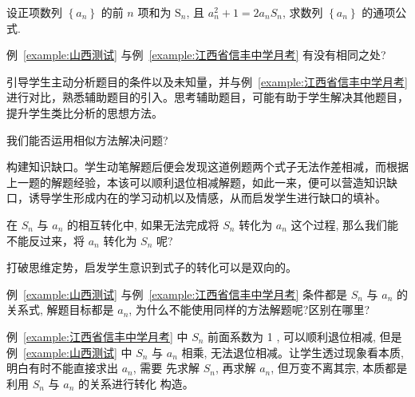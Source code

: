 \begin{example}[2019·山西测试]\label{example:山西测试}
  设正项数列 $\left\{a_{n}\right\}$ 的前 $n$ 项和为 $\mathrm{S}_{n}$, 且 $a_{n}^{2}+1=2 a_{n} S_{n}$, 求数列 $\left\{a_{n}\right\}$ 的通项公式.
\end{example}

\begin{question}
  例~\ref{example:山西测试} 与例~\ref{example:江西省信丰中学月考} 有没有相同之处?
\end{question}

\begin{designgoal}
  引导学生主动分析题目的条件以及未知量，并与例~\ref{example:江西省信丰中学月考} 进行对比，熟悉辅助题目的引入。思考辅助题目，可能有助于学生解决其他题目，提升学生类比分析的思想方法。
\end{designgoal}

\begin{question}
  我们能否运用相似方法解决问题?
\end{question}

\begin{designgoal}
  构建知识缺口。学生动笔解题后便会发现这道例题两个式子无法作差相减，而根据上一题的解题经验，本该可以顺利退位相减解题，如此一来，便可以营造知识缺口，诱导学生形成内在的学习动机以及情感，从而启发学生进行缺口的填补。
\end{designgoal}

\begin{question}
  在 $S_{n}$ 与 $a_{n}$ 的相互转化中, 如果无法完成将 $S_{n}$ 转化为 $a_{n}$ 这个过程, 那么我们能不能反过来，将 $a_{n}$ 转化为 $S_n$ 呢?
\end{question}

\begin{designgoal}
  打破思维定势，启发学生意识到式子的转化可以是双向的。
\end{designgoal}


\begin{question}
  例~\ref{example:山西测试} 与例~\ref{example:江西省信丰中学月考} 条件都是 $S_{n}$ 与 $a_{n}$ 的关系式, 解题目标都是 $a_{n}$, 为什么不能使用同样的方法解题呢?区别在哪里?
\end{question}

\begin{designgoal}
  例~\ref{example:江西省信丰中学月考} 中 $S_n$ 前面系数为 1 , 可以顺利退位相减, 但是例~\ref{example:山西测试} 中 $S_n$ 与 $a_n$ 相乘, 无法退位相减。让学生透过现象看本质, 明白有时不能直接求出 $a_{n}$, 需要 先求解 $S_n$, 再求解 $a_n$, 但万变不离其宗, 本质都是利用 $S_n$ 与 $a_n$ 的关系进行转化 构造。
\end{designgoal}

